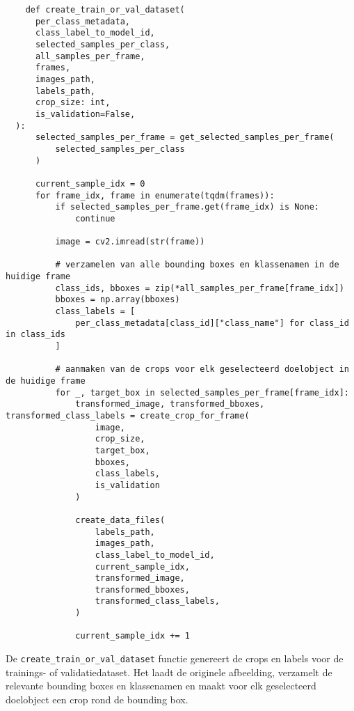 \begin{listing}[H]
  \fontsize{11pt}{9.6pt}
  \begin{verbatim}
    def create_train_or_val_dataset(
      per_class_metadata,
      class_label_to_model_id,
      selected_samples_per_class,
      all_samples_per_frame,
      frames,
      images_path,
      labels_path,
      crop_size: int,
      is_validation=False,
  ):
      selected_samples_per_frame = get_selected_samples_per_frame(
          selected_samples_per_class
      )

      current_sample_idx = 0
      for frame_idx, frame in enumerate(tqdm(frames)):
          if selected_samples_per_frame.get(frame_idx) is None:
              continue

          image = cv2.imread(str(frame))

          # verzamelen van alle bounding boxes en klassenamen in de huidige frame
          class_ids, bboxes = zip(*all_samples_per_frame[frame_idx])
          bboxes = np.array(bboxes)
          class_labels = [
              per_class_metadata[class_id]["class_name"] for class_id in class_ids
          ]

          # aanmaken van de crops voor elk geselecteerd doelobject in de huidige frame
          for _, target_box in selected_samples_per_frame[frame_idx]:
              transformed_image, transformed_bboxes, transformed_class_labels = create_crop_for_frame(
                  image,
                  crop_size,
                  target_box,
                  bboxes,
                  class_labels,
                  is_validation
              )

              create_data_files(
                  labels_path,
                  images_path,
                  class_label_to_model_id,
                  current_sample_idx,
                  transformed_image,
                  transformed_bboxes,
                  transformed_class_labels,
              )

              current_sample_idx += 1
  \end{verbatim}
  \caption[Functie voor het creëren van de trainings- en validatiedatasets]{
    \label{listing:create-train-val-dataset}
    De \texttt{create\_train\_or\_val\_dataset} functie genereert de crops en labels voor de trainings- of validatiedataset.
    Het laadt de originele afbeelding, verzamelt de relevante bounding boxes en klassenamen 
    en maakt voor elk geselecteerd doelobject een crop rond de bounding box.
    }
\end{listing}

